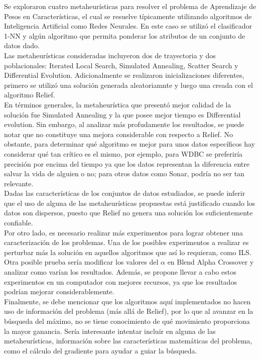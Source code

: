 \documentclass{ci5652}
\begin{document}
Se exploraron cuatro metaheurísticas para resolver el problema de Aprendizaje de
Pesos en Características, el cual se resuelve típicamente utilizando algoritmos
de Inteligencia Artificial como Redes Neurales. En este caso se utilizó el
clasificador 1-NN y algún algoritmo que permita ponderar los atributos de un
conjunto de datos dado.\\

Las metaheurísticas consideradas incluyeron dos de trayectoria y dos
poblacionales: Iterated Local Search, Simulated Annealing, Scatter Search y
Differential Evolution. Adicionalmente se realizaron inicializaciones
diferentes, primero se utilizó una solución generada aleatoriamnte y luego una
creada con el algoritmo Relief.\\

En términos generales, la metaheurística que presentó mejor calidad de la
solución fue Simulated Annealing y la que posee mejor tiempo es Differential
evolution. Sin embargo, al analizar más profudamente los resultados, se puede
notar que no constituye una mejora considerable con respecto a Relief. No
obstante, para determinar qué algoritmo es mejor para unos datos específicos hay
considerar qué tan crítico es el mismo, por ejemplo, para WDBC se preferiría
precisión por encima del tiempo ya que los datos representan la diferencia entre
salvar la vida de alguien o no; para otros datos como Sonar, podría no ser tan
relevante.\\

Dadas las características de los conjuntos de datos estudiados, se puede
inferir que el uso de alguna de las metaheurísticas propuestas está justificado
cuando los datos son dispersos, puesto que Relief no genera una solución los
suficientemente confiable.\\

Por otro lado, es necesario realizar más experimentos para lograr obtener una
caracterización de los problemas. Una de los posibles experimentos a realizar es
perturbar más la solución en aquellos algoritmos que así lo requieran, como ILS.
Otra posible prueba sería modificar los valores del $\alpha$ en Blend Alpha
Crossover y analizar como varían los resultados. Además, se propone llevar a
cabo estos experimentos en un computador con mejores recursos, ya que los
resultados podrían mejorar considerablemente.\\

Finalmente, se debe mencionar que los algoritmos aquí implementados no hacen uso
de información del problema (más allá de Relief), por lo que al avanzar en la
búsqueda del máximo, no se tiene conocimiento de qué movimiento proporciona la
mayor ganancia. Sería interesante intentar incluir en alguna de las
metaheurísticas, información sobre las características matemáticas del problema,
como el cálculo del gradiente para ayudar a guiar la búsqueda.
\end{document}
